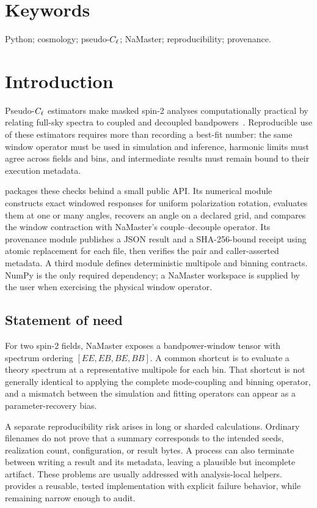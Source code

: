 \section*{Keywords}

Python; cosmology; pseudo-\(C_\ell\); NaMaster; reproducibility; provenance.

\section*{Introduction}

Pseudo-\(C_\ell\) estimators make masked spin-2 analyses computationally
practical by relating full-sky spectra to coupled and decoupled
bandpowers~\cite{Hivon2002,Alonso2019}.  Reproducible use of these estimators
requires more than recording a best-fit number: the same window operator must
be used in simulation and inference, harmonic limits must agree across fields
and bins, and intermediate results must remain bound to their execution
metadata.

\software{} packages these checks behind a small public API.  Its numerical
module constructs exact windowed responses for uniform polarization rotation,
evaluates them at one or many angles, recovers an angle on a declared grid,
and compares the window contraction with NaMaster's couple--decouple operator.
Its provenance module publishes a JSON result and a SHA-256-bound receipt using
atomic replacement for each file, then verifies the pair and caller-asserted
metadata.  A third module defines
deterministic multipole and binning contracts.  NumPy is the only required
dependency; a NaMaster workspace is supplied by the user when exercising the
physical window operator.

\subsection*{Statement of need}

For two spin-2 fields, NaMaster exposes a bandpower-window tensor with spectrum
ordering \([EE,EB,BE,BB]\).  A common shortcut is to evaluate a theory
spectrum at a representative multipole for each bin.  That shortcut is not
generally identical to applying the complete mode-coupling and binning
operator, and a mismatch between the simulation and fitting operators can
appear as a parameter-recovery bias.

A separate reproducibility risk arises in long or sharded calculations.
Ordinary filenames do not prove that a summary corresponds to the intended
seeds, realization count, configuration, or result bytes.  A process can also
terminate between writing a result and its metadata, leaving a plausible but
incomplete artifact.  These problems are usually addressed with analysis-local
helpers.  \software{} provides a reusable, tested implementation with explicit
failure behavior, while remaining narrow enough to audit.

